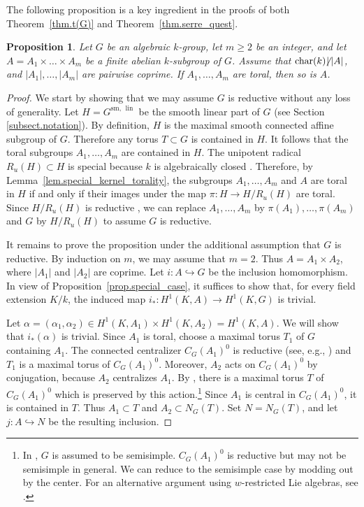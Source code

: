 \documentclass[12pt]{amsart}
\numberwithin{equation}{section}
\newtheorem{proposition}[theorem]{Proposition}
\theoremstyle{remark}
\newcommand{\Char}{\operatorname{char}}
\newcommand{\lin}{\operatorname{lin}}
\newcommand{\Glin}{G^{\mathrm{sm}, \, \lin}}
\begin{document}
The following proposition is a key ingredient in the proofs of both Theorem~\ref{thm.t(G)} and Theorem~\ref{thm.serre_quest}.

\begin{proposition} \label{prop1} Let $G$ be an algebraic $k$-group, let $m\geqslant 2$ be an integer, and let $A = A_1 \times \dots\times A_m$ be a finite abelian $k$-subgroup of $G$. Assume that $\Char(k) \! \! \not \! | \, |A|$, and $|A_1|,\dots,|A_m|$ are pairwise coprime. If $A_1,\dots,A_m$ are toral, then so is $A$. 
\end{proposition}

\begin{proof}We start by showing that we may assume $G$ is reductive without any loss of generality. Let $H = \Glin$ be the smooth linear part of $G$ (see Section \ref{subsect.notation}).
By definition, $H$ is the maximal smooth connected affine subgroup of $G$. Therefore 
any torus $T\subset G$ is contained in $H$. 
It follows that the toral subgroups $A_1,\dots,A_m$ are contained in $H$. The unipotent radical $R_u(H) \subset H$ is special because $k$ is algebraically closed \cite[Proposition 1]{grothendieck-special}. Therefore, by Lemma~\ref{lem.special_kernel_torality}, the subgroups $A_1,\dots,A_m$ and $A$ are toral in $H$ if and only if their images under the map $\pi\colon H\to H/R_u(H)$ are toral. Since $H/R_u(H)$ is reductive \cite[Proposition 19.11]{milne2017algebraic}, we can replace $A_1,\dots,A_m$ by $\pi(A_1),\dots,\pi(A_m)$ and $G$ by $H/R_u(H)$ to assume $G$ is reductive.

It remains to prove the proposition under the additional assumption that $G$ is reductive. By induction on $m$, we may assume that $m=2$. Thus
$A=A_1\times A_2$, where $|A_1|$ and $|A_2|$ are coprime. Let
$i\colon A\hookrightarrow G$ be the inclusion homomorphism. In view of
Proposition~\ref{prop.special_case}, it suffices to show that, for every
field extension $K/k$, the induced map
$i_*\colon H^1(K,A)\to H^1(K,G)$ is trivial.

Let $\alpha=(\alpha_1,\alpha_2)\in H^1(K,A_1)\times H^1(K,A_2)=H^1(K,A)$.
We will show that $i_*(\alpha)$ is trivial. Since $A_1$ is toral, choose a maximal torus $T_1$ of $G$ containing
$A_1$. The connected centralizer $C_G(A_1)^0$ is reductive (see, e.g., \cite[Corollary 2.18(a)]{steinberg-torsion}) and $T_1$ is a
maximal torus of $C_G(A_1)^0$. Moreover, $A_2$ acts on $C_G(A_1)^0$ by
conjugation, because $A_2$ centralizes $A_1$. By
\cite[Theorem 5.16]{springer-steinberg}, there is a maximal torus $T$ of
$C_G(A_1)^0$ which is preserved by this action.\footnote{In \cite{springer-steinberg}, $G$ is assumed to be semisimple. $C_G(A_1)^0$ is reductive but may not be semisimple in general. We can reduce to the semisimple case by modding out by the center. For an alternative argument using $w$-restricted Lie algebras, see \cite[Proposition 5.10]{chernousov2025loop}.} Since $A_1$ is central in
$C_G(A_1)^0$, it is contained in $T$. Thus $A_1\subset T$ and
$A_2\subset N_G(T)$. Set $N=N_G(T)$, and let $j\colon A\hookrightarrow N$
be the resulting inclusion.


\end{proof}
\end{document}
